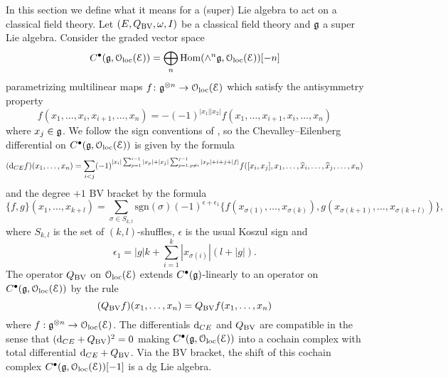 \documentclass[10pt, oneside]{article}
\begin{document}
In this section we define what it means for a (super) Lie algebra to act on a classical field theory. Let $(E, Q_{\mathrm{BV}},\omega, I)$ be a classical field theory and $\mathfrak g$ a super Lie algebra. Consider the graded vector space
\[C^\bullet(\mathfrak g, \mathcal{O}_{\rm loc}(\mathcal E)) = \bigoplus_n \operatorname{Hom}(\wedge^n \mathfrak g, \mathcal{O}_{\rm loc}(\mathcal E))[-n]\]
parametrizing multilinear maps $f\colon \mathfrak g^{\otimes n}\rightarrow \mathcal{O}_{\rm loc}(\mathcal E)$ which satisfy the antisymmetry property
\[f(x_1, \dots, x_i, x_{i+1}, \dots, x_n) = -(-1)^{|x_1||x_2|} f(x_1, \dots, x_{i+1}, x_i, \dots, x_n)\]
where $x_j \in \mathfrak g$. 
We follow the sign conventions of \cite{SafronovCoisoInt}, so the Chevalley--Eilenberg differential on $C^\bullet(\mathfrak g, \mathcal{O}_{\rm loc}(\mathcal E))$ is given by the formula
\[({\rm d}_{CE} f)(x_1, \dots, x_n) = \sum_{i < j}(-1)^{|x_i| \sum_{p=1}^{i-1} |x_p| + |x_j| \sum_{p=1,p\neq i}^{j-1} |x_p| +i+j+|f|} f([x_i, x_j], x_1, \dots, \widehat{x}_i, \dots, \widehat{x}_j, \dots, x_n)\]
and the degree $+1$ BV bracket by the formula
\[\{f, g\}(x_1, \dots, x_{k+l}) = \sum_{\sigma\in S_{k, l}} \mathrm{sgn}(\sigma) (-1)^{\epsilon+\epsilon_1} \{f(x_{\sigma(1)}, \dots, x_{\sigma(k)}), g(x_{\sigma(k+1)}, \dots, x_{\sigma(k+l)})\},\]
where $S_{k, l}$ is the set of $(k, l)$-shuffles, $\epsilon$ is the usual Koszul sign and
\[\epsilon_1 = |g|k + \sum_{i=1}^k |x_{\sigma(i)}|(l+|g|).\]
The operator $Q_{\mathrm{BV}}$ on $\mathcal{O}_{\rm loc}(\mathcal E)$ extends $C^\bullet(\mathfrak g)$-linearly to an operator on $C^\bullet(\mathfrak g, \mathcal{O}_{\rm loc}(\mathcal E))$ by the rule
\[
(Q_{\mathrm{BV}} f)(x_1,\ldots, x_n) = Q_{\mathrm{BV}} f(x_1,\ldots, x_n) 
\]
where $f : \mathfrak g^{\otimes n} \to \mathcal{O}_{\rm loc}(\mathcal E)$. 
The differentials ${\rm d}_{CE}$ and $Q_{\mathrm{BV}}$ are compatible in the sense that $({\rm d}_{CE} + Q_{\mathrm{BV}})^2 = 0$ making $C^\bullet(\mathfrak g, \mathcal{O}_{\rm loc}(\mathcal E))$ into a cochain complex with total differential ${\rm d}_{CE} + Q_{\mathrm{BV}}$. 
Via the BV bracket, the shift of this cochain complex $C^\bullet(\mathfrak g, \mathcal{O}_{\rm loc}(\mathcal E))[-1]$ is a dg Lie algebra.
\end{document}
